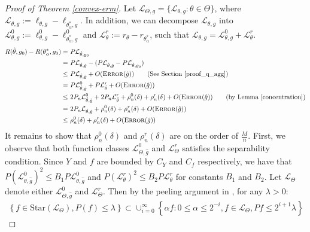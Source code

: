 \documentclass[12pt]{extarticle} %
\newcommand{\error}{\ensuremath{\textsc{Error}}}
\begin{document}
\begin{proof}[Proof of Theorem \ref{convex-erm}]
Let $\mathcal{L}_{\Theta,g} = \{\mathcal{L}_{\theta,g}:\theta\in \Theta\}$, where $\mathcal{L}_{\theta,g} :=\ell_{\theta,g} - \ell_{\theta^*_\alpha,g} $. In addition, we can decompose $\mathcal{L}_{\theta,g}$ into $\mathcal{L}_{\theta,g}^0:=\ell^0_{\theta,g} - \ell_{\theta^*_\alpha,g}^0$ and  $\mathcal{L}_{\theta}^r:=r_{\theta}-r_{\theta^*_\alpha}$, such that $\mathcal{L}_{\theta,g} = \mathcal{L}_{\theta,g}^0+\mathcal{L}_{\theta}^r$.
\begin{align*}
    R(\hat{\theta},g_0) - R(\theta^*_{\alpha}, g_0) =~& P\mathcal{L}_{\hat{\theta},g_0}\\
    =~& P\mathcal{L}_{\hat{\theta},\hat{g}} - (P\mathcal{L}_{\hat{\theta},\hat{g}}-P\mathcal{L}_{\hat{\theta},g_0})\\
    \leq~& P\mathcal{L}_{\hat{\theta},\hat{g}} + O(\error(\hat{g})) \tag{See Section \ref{proof_q_agg}}\\
    =~& P\mathcal{L}^0_{\hat{\theta},\hat{g}} + P\mathcal{L}^r_{\hat{\theta}} + O(\error(\hat{g}))\\
    \leq~& 2 P_n\mathcal{L}^0_{\hat{\theta},\hat{g}} + 2P_n\mathcal{L}^r_{\hat{\theta}} + \rho^0_n(\delta) + \rho^r_n(\delta) +O(\error(\hat{g})) \tag{by Lemma \ref{concentration}}\\
    =~&2 P_n \mathcal{L}_{\hat{\theta},\hat{g}} + \rho^0_n(\delta) + \rho^r_n(\delta) +O(\error(\hat{g}))\\
    \leq~& \rho^0_n(\delta) + \rho^r_n(\delta) +O(\error(\hat{g}))
\end{align*}
It remains to show that $\rho^0_n(\delta) $ and $ \rho^r_n(\delta)$ are on the order of $\frac{M}{n}$. First, we observe that both function classes $\mathcal{L}^{0}_{\Theta,\hat{g}}$ and $\mathcal{L}^{r}_{\Theta}$ satisfies the separability condition. Since $Y$ and $f$ are bounded by $C_Y$ and $C_f$ respectively, we have that $P(\mathcal{L}^{0}_{\theta,\hat{g}})^2\leq B_1 P\mathcal{L}^{0}_{\theta,\hat{g}}$ and $P(\mathcal{L}^{r}_{\theta})^2\leq B_2 P\mathcal{L}^{r}_{\theta}$ for constants $B_1$ and $B_2$.
Let $\mathcal{L}_{\Theta}$ denote either $\mathcal{L}^{0}_{\Theta,\hat{g}}$ and $\mathcal{L}^{r}_{\Theta}$. Then by the peeling argument in \cite{bartlett2012}, for any $\lambda>0$:
\begin{align*} 
\left\{f\in\text{Star}(\mathcal{L}_{\Theta}), P(f)\leq \lambda\right\}\subset \cup_{i=0}^{\infty}\left\{\alpha f: 0\leq \alpha \leq 2^{-i}, f\in \mathcal{L}_{\Theta}, Pf\leq 2^{i+1}\lambda\right\}
\end{align*}

\end{proof}
\end{document}
